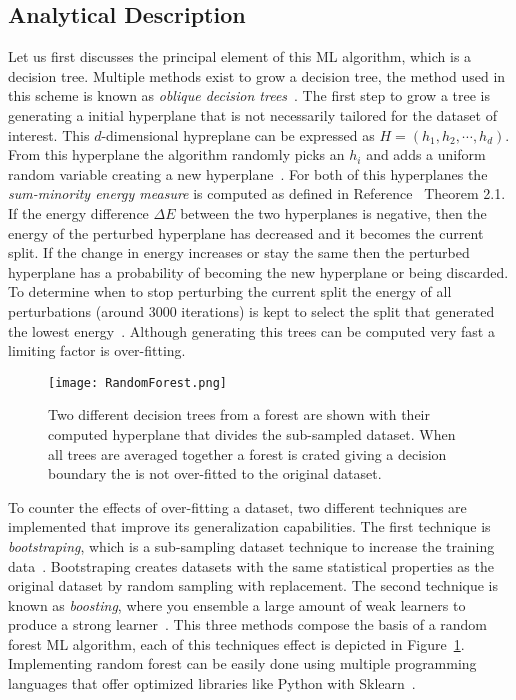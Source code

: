    
\subsection{Analytical Description}

 Let us first discusses the principal element of this ML algorithm, which is a decision tree. Multiple methods exist to grow a decision tree, the method used in this scheme is known as  \textit{oblique decision trees}~\cite{ho1995random}.  The first step to grow a tree is generating a initial hyperplane that is not necessarily tailored for the dataset of interest. This $d$-dimensional hypreplane can be expressed as $H=(h_{1},h_{2},\cdots,h_{d})$. From this hyperplane the algorithm randomly picks an $h_{i}$ and adds a uniform random variable creating a new hyperplane~\cite{heath1993induction}. For both of this hyperplanes the \textit{sum-minority energy measure} is computed as defined in Reference~\cite{heath1993induction} Theorem 2.1. If the energy difference $\Delta E$ between the two hyperplanes is negative, then the energy of the perturbed hyperplane has decreased and it becomes the current split. If the change in energy increases or stay the same then the perturbed hyperplane has a probability of becoming the new hyperplane or being discarded. To determine when to stop perturbing the current split the energy of all perturbations (around 3000 iterations) is kept to select the split that generated the lowest energy~\cite{heath1993induction}. Although generating this trees can be computed very fast a limiting factor is over-fitting.~\\

\begin{figure}[h]
\centering
\texttt{[image: RandomForest.png]}
\caption{ Two different decision trees from a forest are shown  with their computed hyperplane that divides the sub-sampled dataset. When all trees are averaged together a forest is crated giving a decision boundary the is not over-fitted to the original dataset. }
\label{fig:RFshow}
\end{figure}

To counter the effects of over-fitting a dataset, two different techniques are implemented that improve its generalization capabilities. The first technique is \textit{ bootstraping}, which is a sub-sampling dataset technique to increase the training data~\cite{friedman2002stochastic}. Bootstraping creates datasets with the same statistical properties as the original dataset by random sampling with replacement. The second technique is known as \textit{boosting}, where you ensemble a large amount of weak learners to produce a strong learner~\cite{hancock2012bootstrapping}. This three methods compose the basis of a random forest ML algorithm, each of this techniques effect is depicted in Figure~\ref{fig:RFshow}. Implementing random forest can be easily done using multiple programming languages that offer optimized libraries like Python with Sklearn~\cite{scikit-learn}.

